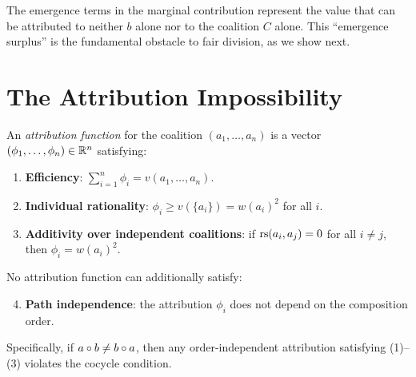\begin{remark}
The emergence terms in the marginal contribution represent the value
that can be attributed to neither $b$ alone nor to the coalition $C$ alone.
This ``emergence surplus'' is the fundamental obstacle to fair division,
as we show next.
\end{remark}


\section{The Attribution Impossibility}

\begin{definition}
\label{def:attribution}
An \emph{attribution function} for the coalition $(a_1, \ldots, a_n)$ is a
vector $(\phi_1, \ldots, \phi_n) \in \mathbb{R}^n$ satisfying:
\begin{enumerate}
  \item \textbf{Efficiency}: $\sum_{i=1}^n \phi_i = v(a_1, \ldots, a_n)$.
  \item \textbf{Individual rationality}: $\phi_i \geq v(\{a_i\}) = w(a_i)^2$
        for all $i$.
  \item \textbf{Additivity over independent coalitions}: if $\mathrm{rs}(a_i, a_j) = 0$
        for all $i \neq j$, then $\phi_i = w(a_i)^2$.
\end{enumerate}
\end{definition}

\begin{theorem}
\label{thm:attribution-impossibility-ordered}
No attribution function can additionally satisfy:
\begin{enumerate}
  \setcounter{enumi}{3}
  \item \textbf{Path independence}: the attribution $\phi_i$ does not depend
        on the composition order.
\end{enumerate}
Specifically, if $a \circ b \neq b \circ a$, then any order-independent
attribution satisfying (1)--(3) violates the cocycle condition.
\end{theorem}

